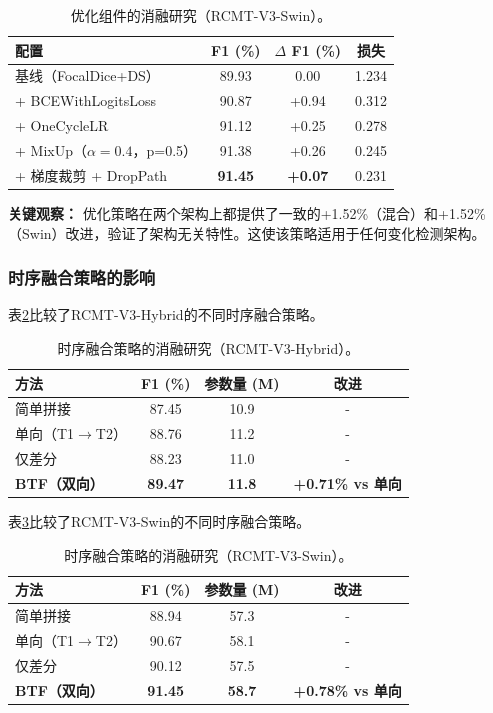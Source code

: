 \documentclass[journal]{IEEEtran}
\begin{document}
\begin{table}[ht]
\centering
\caption{优化组件的消融研究（RCMT-V3-Swin）。}
\label{tab:opt_swin}
\begin{tabular}{lccc}
\toprule
\textbf{配置} & \textbf{F1 (\%)} & \textbf{$\Delta$ F1 (\%)} & \textbf{损失} \\
\midrule
    基线（FocalDice+DS） & 89.93 & 0.00 & 1.234 \\
    + BCEWithLogitsLoss & 90.87 & +0.94 & 0.312 \\
    + OneCycleLR & 91.12 & +0.25 & 0.278 \\
    + MixUp（$\alpha=0.4$，p=0.5） & 91.38 & +0.26 & 0.245 \\
    + 梯度裁剪 + DropPath & \textbf{91.45} & \textbf{+0.07} & 0.231 \\
\bottomrule
\end{tabular}
\end{table}

\textbf{关键观察：} 优化策略在两个架构上都提供了一致的+1.52\%（混合）和+1.52\%（Swin）改进，验证了架构无关特性。这使该策略适用于任何变化检测架构。

\subsubsection{时序融合策略的影响}

表\ref{tab:fusion_hybrid}比较了RCMT-V3-Hybrid的不同时序融合策略。

\begin{table}[ht]
\centering
\caption{时序融合策略的消融研究（RCMT-V3-Hybrid）。}
\label{tab:fusion_hybrid}
\begin{tabular}{lccc}
\toprule
\textbf{方法} & \textbf{F1 (\%)} & \textbf{参数量 (M)} & \textbf{改进} \\
\midrule
    简单拼接 & 87.45 & 10.9 & - \\
    单向（T1$\rightarrow$T2） & 88.76 & 11.2 & - \\
    仅差分 & 88.23 & 11.0 & - \\
    \textbf{BTF（双向）} & \textbf{89.47} & \textbf{11.8} & \textbf{+0.71\% vs 单向} \\
\bottomrule
\end{tabular}
\end{table}

表\ref{tab:fusion_swin}比较了RCMT-V3-Swin的不同时序融合策略。

\begin{table}[ht]
\centering
\caption{时序融合策略的消融研究（RCMT-V3-Swin）。}
\label{tab:fusion_swin}
\begin{tabular}{lccc}
\toprule
\textbf{方法} & \textbf{F1 (\%)} & \textbf{参数量 (M)} & \textbf{改进} \\
\midrule
    简单拼接 & 88.94 & 57.3 & - \\
    单向（T1$\rightarrow$T2） & 90.67 & 58.1 & - \\
    仅差分 & 90.12 & 57.5 & - \\
    \textbf{BTF（双向）} & \textbf{91.45} & \textbf{58.7} & \textbf{+0.78\% vs 单向} \\
\bottomrule
\end{tabular}
\end{table}
\end{document}
